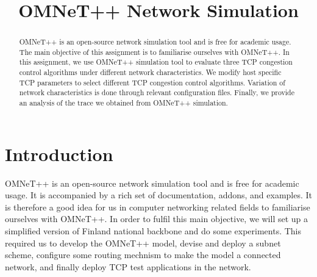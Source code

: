 \documentclass[conference,a4paper]{../../sty/IEEEtran}
\begin{document}
%
\title{OMNeT++ Network Simulation}


\author{
}


\maketitle


\begin{abstract}

OMNeT++ is an open-source network simulation tool and is free for academic usage.
The main objective of this assignment is to familiarise ourselves with OMNeT++.
In this assignment, we use OMNeT++ simulation tool to evaluate three TCP congestion control algorithms under different network characteristics.
We modify host specific TCP parameters to select different TCP congestion control algorithms.
Variation of network characteristics is done through relevant configuration files.
Finally, we provide an analysis of the trace we obtained from OMNeT++ simulation.

\end{abstract}




\section{Introduction}

OMNeT++ is an open-source network simulation tool and is free for academic usage.
It is accompanied by a rich set of documentation, addons, and examples.
It is therefore a good idea for us in computer networking related fields to familiarise ourselves with OMNeT++.
In order to fulfil this main objective, we will set up a simplified version of Finland national backbone and do some experiments.
This required us to develop the OMNeT++ model, devise and deploy a subnet scheme, configure some routing mechnism to make the model a connected network, and finally deploy TCP test applications in the network.
\end{document}
